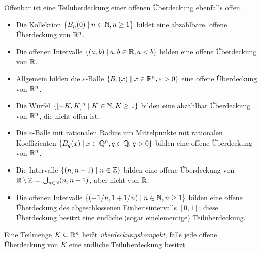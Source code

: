 \documentclass[a4paper,10pt]{article}
\begin{document}
\begin{bem}
 Offenbar ist eine Teilüberdeckung einer offenen Überdeckung ebenfalls offen.
\end{bem}


\begin{bsp}
 \begin{itemize}
  \item
   Die Kollektion $\{B_n(0) \mid n \in \mathbb{N}, n \geq 1\}$ bildet eine abzählbare, offene Überdeckung von $\mathbb{R}^n$.
  \item
   Die offenen Intervalle $\{(a,b) \mid a,b \in \mathbb{R}, a < b\}$ bilden eine offene Überdeckung von $\mathbb{R}$.
  \item
   Allgemein bilden die $\varepsilon$-Bälle $\{B_\varepsilon(x) \mid x \in \mathbb{R}^n, \varepsilon > 0\}$ eine offene Überdeckung von $\mathbb{R}^n$.
  \item
   Die Würfel $\{[-K,K]^n \mid K \in \mathbb{N}, K \geq 1\}$ bilden eine abzählbar Überdeckung von $\mathbb{R}^n$, die nicht offen ist.
  \item
   Die $\varepsilon$-Bälle mit rationalen Radius um Mittelpunkte mit rationalen Koeffizienten $\{B_q(x) \mid x \in \mathbb{Q}^n, q \in \mathbb{Q}, q > 0\}$ bilden eine offene Überdeckung von $\mathbb{R}^n$.
  \item
   Die Intervalle $\{(n,n+1) \mid n \in \mathbb{Z}\}$ bilden eine offene Überdeckung von $\mathbb{R} \setminus \mathbb{Z} = \bigcup_{n \in \mathbb{N}} (n,n+1)$, aber nicht von $\mathbb{R}$.
  \item
   Die offenen Intervalle $\{ (-1/n, 1+1/n) \mid n \in \mathbb{N}, n \geq 1\}$ bilden eine offene Überdeckung des abgeschlossenen Einheitsintervalls $[0,1]$; diese Überdeckung besitzt eine endliche (sogar einelementige) Teilüberdeckung.
 \end{itemize}
\end{bsp}


\begin{defi}
 Eine Teilmenge $K \subseteq \mathbb{R}^n$ heißt \emph{überdeckungskompakt}, falls jede offene Überdeckung von $K$ eine endliche Teilüberdeckung besitzt.
\end{defi}
\end{document}
